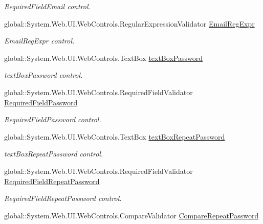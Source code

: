 \begin{DoxyCompactItemize}
\begin{DoxyCompactList}\small\item\em Required\+Field\+Email control. \end{DoxyCompactList}\item 
global\+::\+System.\+Web.\+U\+I.\+Web\+Controls.\+Regular\+Expression\+Validator \mbox{\hyperlink{classWebApplication_1_1Registro_a171880c89476a5b9fe1ae88f343a6b93}{Email\+Reg\+Expr}}
\begin{DoxyCompactList}\small\item\em Email\+Reg\+Expr control. \end{DoxyCompactList}\item 
global\+::\+System.\+Web.\+U\+I.\+Web\+Controls.\+Text\+Box \mbox{\hyperlink{classWebApplication_1_1Registro_a7ec9a6762b64871aac1ce8518bd33f29}{text\+Box\+Password}}
\begin{DoxyCompactList}\small\item\em text\+Box\+Password control. \end{DoxyCompactList}\item 
global\+::\+System.\+Web.\+U\+I.\+Web\+Controls.\+Required\+Field\+Validator \mbox{\hyperlink{classWebApplication_1_1Registro_a73fc7b6c391087c89de40b8f91181b15}{Required\+Field\+Password}}
\begin{DoxyCompactList}\small\item\em Required\+Field\+Password control. \end{DoxyCompactList}\item 
global\+::\+System.\+Web.\+U\+I.\+Web\+Controls.\+Text\+Box \mbox{\hyperlink{classWebApplication_1_1Registro_abdcdc987a1957369c80898f5a3b1711a}{text\+Box\+Repeat\+Password}}
\begin{DoxyCompactList}\small\item\em text\+Box\+Repeat\+Password control. \end{DoxyCompactList}\item 
global\+::\+System.\+Web.\+U\+I.\+Web\+Controls.\+Required\+Field\+Validator \mbox{\hyperlink{classWebApplication_1_1Registro_ad9609d7ca383d27791eea9f0b62ea57e}{Required\+Field\+Repeat\+Password}}
\begin{DoxyCompactList}\small\item\em Required\+Field\+Repeat\+Password control. \end{DoxyCompactList}\item 
global\+::\+System.\+Web.\+U\+I.\+Web\+Controls.\+Compare\+Validator \mbox{\hyperlink{classWebApplication_1_1Registro_a62c871a2abcb43fde486dc4539c595d3}{Compare\+Repeat\+Password}}

\end{DoxyCompactItemize}
